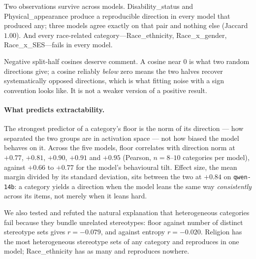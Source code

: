 \documentclass{article}
\begin{document}
Two observations survive across models. Disability\_status and
Physical\_appearance produce a reproducible direction in every model that
produced any; three models agree exactly on that pair and nothing else
(Jaccard $1.00$). And every race-related category---Race\_ethnicity,
Race\_x\_gender, Race\_x\_SES---fails in every model.

Negative split-half cosines deserve comment. A cosine near $0$ is what two
random directions give; a cosine reliably \emph{below} zero means the two halves
recover systematically opposed directions, which is what fitting noise with a
sign convention looks like. It is not a weaker version of a positive result.

\paragraph{What predicts extractability.} The strongest predictor of a
category's floor is the norm of its direction --- how separated the two groups
are in activation space --- not how biased the model behaves on it. Across the
five models, floor correlates with direction norm at $+0.77$, $+0.81$, $+0.90$,
$+0.91$ and $+0.95$ (Pearson, $n{=}8$--$10$ categories per model), against
$+0.66$ to $+0.77$ for the model's behavioural tilt. Effect size, the mean
margin divided by its standard deviation, sits between the two at $+0.84$ on
\texttt{qwen-14b}: a category yields a direction when the model leans the same
way \emph{consistently} across its items, not merely when it leans hard.

We also tested and refuted the natural explanation that heterogeneous categories
fail because they bundle unrelated stereotypes: floor against number of distinct
stereotype sets gives $r=-0.079$, and against entropy $r=-0.020$. Religion has
the most heterogeneous stereotype sets of any category and reproduces in one
model; Race\_ethnicity has as many and reproduces nowhere.
\end{document}
